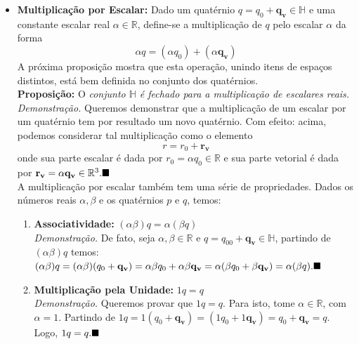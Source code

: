 \documentclass[a4paper,12pt]{article}
\begin{document}
\begin{itemize}
		\item \textbf{Multiplicação por Escalar:} Dado um quatérnio $q=q_0+\mathbf{q_v} \in \mathbb{H}$ e uma constante escalar real $\alpha \in \mathbb{R}$, define-se a multiplicação de $q$ pelo escalar $\alpha$ da forma
		\begin{equation}
		\alpha q=(\alpha q_0)+(\alpha \mathbf{q_v})
		\end{equation}
		A próxima proposição mostra que esta operação, unindo itens de espaços distintos, está bem definida no conjunto dos quatérnios.
		\\ \newline \textbf{Proposição:} O \textit{conjunto $\mathbb{H}$ é fechado para a multiplicação de escalares reais.}
		\\ \textit{Demonstração.} Queremos demonstrar que a multiplicação de um escalar por um quatérnio tem por resultado um novo quatérnio. Com efeito: acima, podemos considerar tal multiplicação como o elemento 
		\begin{equation*}
		r=r_0+\mathbf{r_v}
		\end{equation*}
		onde sua parte escalar é dada por $r_0=\alpha q_0 \in \mathbb{R}$ e sua parte vetorial é dada por $\mathbf{r_v}=\alpha \mathbf{q_v} \in \mathbb{R}^3.\hfill\blacksquare$
		\\ \newline A multiplicação por escalar também tem uma série de propriedades. Dados os números reais $\alpha,\beta$ e os quatérnios $p$ e $q$, temos:
		\begin{enumerate}
			\item \textbf{Associatividade:} $(\alpha \beta)q=\alpha(\beta q)$ 
			\\ \newline \textit{Demonstração.} De fato, seja $\alpha, \beta \in \mathbb{R}$ e $q=q_00+\mathbf{q_v} \in \mathbb{H}$, partindo de $(\alpha \beta)q$ temos:
			\\ \newline $(\alpha \beta)q=(\alpha \beta)(q_0+\mathbf{q_v})=\alpha \beta q_0+\alpha \beta \mathbf{q_v}=\alpha(\beta q_0+\beta \mathbf{q_v})=\alpha(\beta q).\hfill\blacksquare$
			\\ \item \textbf{Multiplicação pela Unidade:} $1q=q$
			\\ \newline \textit{Demonstração.} Queremos provar que $1q=q$. Para isto, tome $\alpha \in \mathbb{R}$, com $\alpha = 1$. Partindo de $1q=1(q_0+\mathbf{q_v})=(1q_0+1\mathbf{q_v})=q_0+\mathbf{q_v}=q$. Logo, $1q=q.\hfill\blacksquare$

\end{enumerate}
\end{itemize}
\end{document}
